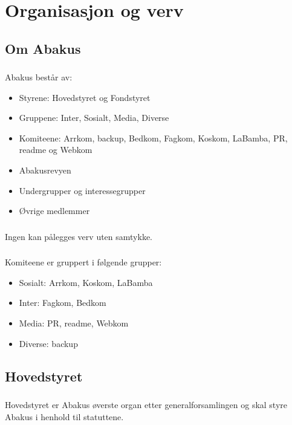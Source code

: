 \section{Organisasjon og verv}
\subsection{Om Abakus}

\subsubsection{}
Abakus består av:

\begin{itemize}
\item Styrene: Hovedstyret og Fondstyret
\item Gruppene: Inter, Sosialt, Media, Diverse
\item Komiteene: Arrkom, backup, Bedkom, Fagkom, Koskom, LaBamba, PR, readme og Webkom
\item Abakusrevyen
\item Undergrupper og interessegrupper
\item Øvrige medlemmer
\end{itemize}

\subsubsection{}
Ingen kan pålegges verv uten samtykke.

\subsubsection{}
Komiteene er gruppert i følgende grupper:

\begin{itemize}
\item Sosialt: Arrkom, Koskom, LaBamba
\item Inter: Fagkom, Bedkom
\item Media: PR, readme, Webkom
\item Diverse: backup
\end{itemize}

\subsection{Hovedstyret}

\subsubsection{}
Hovedstyret er Abakus øverste organ etter generalforsamlingen og skal styre
Abakus i henhold til statuttene.

